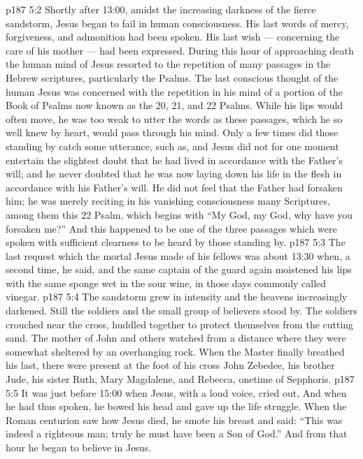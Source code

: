 \vs p187 5:2 Shortly after 13:00, amidst the increasing darkness of the fierce sandstorm, Jesus began to fail in human consciousness. His last words of mercy, forgiveness, and admonition had been spoken. His last wish --- concerning the care of his mother --- had been expressed. During this hour of approaching death the human mind of Jesus resorted to the repetition of many passages in the Hebrew scriptures, particularly the Psalms. The last conscious thought of the human Jesus was concerned with the repetition in his mind of a portion of the Book of Psalms now known as the 20, 21, and 22 Psalms. While his lips would often move, he was too weak to utter the words as these passages, which he so well knew by heart, would pass through his mind. Only a few times did those standing by catch some utterance, such as,  and  Jesus did not for one moment entertain the slightest doubt that he had lived in accordance with the Father’s will; and he never doubted that he was now laying down his life in the flesh in accordance with his Father’s will. He did not feel that the Father had forsaken him; he was merely reciting in his vanishing consciousness many Scriptures, among them this 22 Psalm, which begins with “My God, my God, why have you forsaken me?” And this happened to be one of the three passages which were spoken with sufficient clearness to be heard by those standing by.
\vs p187 5:3 \pc The last request which the mortal Jesus made of his fellows was about 13:30 when, a second time, he said,  and the same captain of the guard again moistened his lips with the same sponge wet in the sour wine, in those days commonly called vinegar.
\vs p187 5:4 \pc The sandstorm grew in intensity and the heavens increasingly darkened. Still the soldiers and the small group of believers stood by. The soldiers crouched near the cross, huddled together to protect themselves from the cutting sand. The mother of John and others watched from a distance where they were somewhat sheltered by an overhanging rock. When the Master finally breathed his last, there were present at the foot of his cross John Zebedee, his brother Jude, his sister Ruth, Mary Magdalene, and Rebecca, onetime of Sepphoris.
\vs p187 5:5 It was just before 15:00 when Jesus, with a loud voice, cried out,  And when he had thus spoken, he bowed his head and gave up the life struggle. When the Roman centurion saw how Jesus died, he smote his breast and said: “This was indeed a righteous man; truly he must have been a Son of God.” And from that hour he began to believe in Jesus.
